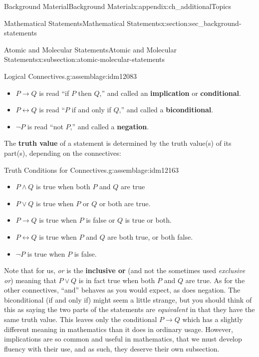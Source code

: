 \documentclass[oneside,10pt,]{book}
\newcommand{\terminology}[1]{\textbf{#1}}
\numberwithin{equation}{chapter}
\def\iff{\leftrightarrow}
\def\imp{\rightarrow}
\begin{document}
\begin{appendixptx}{Background Material}{}{Background Material}{}{}{x:appendix:ch_additionalTopics}
\begin{sectionptx}{Mathematical Statements}{}{Mathematical Statements}{}{}{x:section:sec_background-statements}
\begin{subsectionptx}{Atomic and Molecular Statements}{}{Atomic and Molecular Statements}{}{}{x:subsection:atomic-molecular-statements}
\begin{assemblage}{Logical Connectives.}{g:assemblage:idm12083}
\begin{itemize}[label=\textbullet]
\item{}\(P \imp Q\) is read ``if \(P\) then \(Q\),'' and called an \terminology{implication} or \terminology{conditional}.    %
\item{}\(P \iff Q\) is read ``\(P\) if and only if \(Q\),'' and called a \terminology{biconditional}.   %
\item{}\(\neg P\) is read ``not \(P\),'' and called a \terminology{negation}.  \label{g:notation:idm12158}%
\end{itemize}
%
\end{assemblage}
The \terminology{truth value} of a statement is determined by the truth value(s) of its part(s), depending on the connectives:%
\begin{assemblage}{Truth Conditions for Connectives.}{g:assemblage:idm12163}%
%
\begin{itemize}[label=\textbullet]
\item{}\(P \wedge Q\) is true when both \(P\) and \(Q\) are true%
\item{}\(P \vee Q\) is true when \(P\) or \(Q\) or both are true.%
\item{}\(P \imp Q\) is true when \(P\) is false or \(Q\) is true or both.%
\item{}\(P \iff Q\) is true when \(P\) and \(Q\) are both true, or both false.%
\item{}\(\neg P\) is true when \(P\) is false.%
\end{itemize}
%
\end{assemblage}
Note that for us, \emph{or} is the \terminology{inclusive or}  (and not the sometimes used \emph{exclusive or}) meaning that \(P \vee Q\) is in fact true when both \(P\) and \(Q\) are true. As for the other connectives, ``and'' behaves as you would expect, as does negation. The biconditional (if and only if) might seem a little strange, but you should think of this as saying the two parts of the statements are \emph{equivalent} in that they have the same truth value. This leaves only the conditional \(P \imp Q\) which has a slightly different meaning in mathematics than it does in ordinary usage. However, implications are so common and useful in mathematics, that we must develop fluency with their use, and as such, they deserve their own subsection.%
\end{subsectionptx}

\end{sectionptx}
\end{appendixptx}
\end{document}
